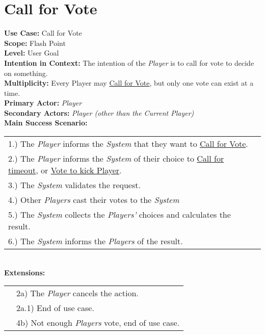 \documentclass{article}
\begin{document}
	\section*{Call for Vote}
	\textbf{Use Case:} Call for Vote\\
	\textbf{Scope:} Flash Point\\
	\textbf{Level:} User Goal\\
	\textbf{Intention in Context:} The intention of the \textit{Player} is to call for vote to decide on something.\\
	\textbf{Multiplicity: } Every Player may \underline{Call for Vote}, but only one vote can exist at a time.\\
	\textbf{Primary Actor:} \textit{Player}\\
	\textbf{Secondary Actors:} \textit{Player (other than the Current Player)}\\
	\textbf{Main Success Scenario:}\\
	\begin{tabular}{l l}
		1.) The \textit{Player} informs the \textit{System} that they want to \underline{Call for Vote}.\\
		2.) The \textit{Player} informs the \textit{System} of their choice to \underline{Call for timeout}, or \underline{Vote to kick Player}.\\
		3.) The \textit{System} validates the request.\\
		4.) Other \textit{Players} cast their votes to the \textit{System}\\
		5.) The \textit{System} collects the \textit{Players'} choices and calculates the result.\\
		6.) The \textit{System} informs the \textit{Players} of the result.
	\end{tabular}\\
	\textbf{Extensions:}\\
	\begin{tabular}{l l}
		&2a) The \textit{Player} cancels the action.\\
		&2a.1) End of use case.\\
		&4b) Not enough \textit{Players} vote, end of use case.
	\end{tabular}
\end{document}
